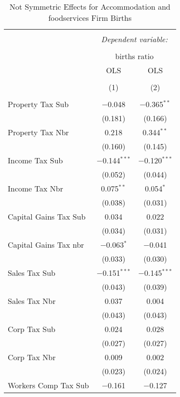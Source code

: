 
\begin{table}[!htbp] \centering 
  \caption{Not Symmetric Effects for  Accommodation and foodservices Firm Births} 
  \label{} 
\begin{tabular}{@{\extracolsep{5pt}}lcc} 
\\[-1.8ex]\hline 
\hline \\[-1.8ex] 
 & \multicolumn{2}{c}{\textit{Dependent variable:}} \\ 
\cline{2-3} 
\\[-1.8ex] & \multicolumn{2}{c}{births ratio} \\ 
 & OLS & OLS \\ 
\\[-1.8ex] & (1) & (2)\\ 
\hline \\[-1.8ex] 
 Property Tax Sub & $-$0.048 & $-$0.365$^{**}$ \\ 
  & (0.181) & (0.166) \\ 
  Property Tax Nbr & 0.218 & 0.344$^{**}$ \\ 
  & (0.160) & (0.145) \\ 
  Income Tax Sub & $-$0.144$^{***}$ & $-$0.120$^{***}$ \\ 
  & (0.052) & (0.044) \\ 
  Income Tax Nbr & 0.075$^{**}$ & 0.054$^{*}$ \\ 
  & (0.038) & (0.031) \\ 
  Capital Gains Tax Sub & 0.034 & 0.022 \\ 
  & (0.034) & (0.031) \\ 
  Capital Gains Tax nbr & $-$0.063$^{*}$ & $-$0.041 \\ 
  & (0.033) & (0.030) \\ 
  Sales Tax Sub & $-$0.151$^{***}$ & $-$0.145$^{***}$ \\ 
  & (0.043) & (0.039) \\ 
  Sales Tax Nbr & 0.037 & 0.004 \\ 
  & (0.043) & (0.043) \\ 
  Corp Tax Sub & 0.024 & 0.028 \\ 
  & (0.027) & (0.027) \\ 
  Corp Tax Nbr & 0.009 & 0.002 \\ 
  & (0.023) & (0.024) \\ 
  Workers Comp Tax Sub & $-$0.161 & $-$0.127 \\ 

\end{tabular}
\end{table}
